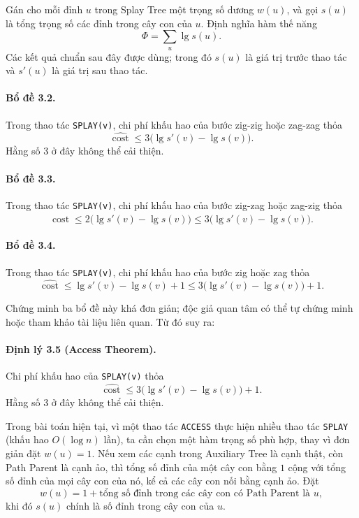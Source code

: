 \documentclass[11pt]{article}
\begin{document}
Gán cho mỗi đỉnh $u$ trong Splay Tree một trọng số dương $w(u)$, và gọi $s(u)$
là tổng trọng số các đỉnh trong cây con của $u$. Định nghĩa hàm thế năng
\[
  \Phi=\sum_u \lg s(u).
\]
Các kết quả chuẩn sau đây được dùng; trong đó $s(u)$ là giá trị trước thao tác
và $s'(u)$ là giá trị sau thao tác.

\paragraph{Bổ đề 3.2.}
Trong thao tác \texttt{SPLAY(v)}, chi phí khấu hao của bước zig-zig hoặc
zag-zag thỏa
\[
  \widehat{\operatorname{cost}}
  \le 3\bigl(\lg s'(v)-\lg s(v)\bigr).
\]
Hằng số $3$ ở đây không thể cải thiện.

\paragraph{Bổ đề 3.3.}
Trong thao tác \texttt{SPLAY(v)}, chi phí khấu hao của bước zig-zag hoặc
zag-zig thỏa
\[
  \widehat{\operatorname{cost}}
  \le 2\bigl(\lg s'(v)-\lg s(v)\bigr)
  \le 3\bigl(\lg s'(v)-\lg s(v)\bigr).
\]

\paragraph{Bổ đề 3.4.}
Trong thao tác \texttt{SPLAY(v)}, chi phí khấu hao của bước zig hoặc zag thỏa
\[
  \widehat{\operatorname{cost}}
  \le \lg s'(v)-\lg s(v)+1
  \le 3\bigl(\lg s'(v)-\lg s(v)\bigr)+1.
\]

Chứng minh ba bổ đề này khá đơn giản; độc giả quan tâm có thể tự chứng minh
hoặc tham khảo tài liệu liên quan. Từ đó suy ra:

\paragraph{Định lý 3.5 (Access Theorem).}
Chi phí khấu hao của \texttt{SPLAY(v)} thỏa
\[
  \widehat{\operatorname{cost}}
  \le 3\bigl(\lg s'(v)-\lg s(v)\bigr)+1.
\]
Hằng số $3$ ở đây không thể cải thiện.

Trong bài toán hiện tại, vì một thao tác \texttt{ACCESS} thực hiện nhiều thao
tác \texttt{SPLAY} (khấu hao $O(\log n)$ lần), ta cần chọn một hàm trọng số
phù hợp, thay vì đơn giản đặt $w(u)=1$. Nếu xem các cạnh trong Auxiliary Tree
là cạnh thật, còn Path Parent là cạnh ảo, thì tổng số đỉnh của một cây con bằng
$1$ cộng với tổng số đỉnh của mọi cây con của nó, kể cả các cây con nối bằng
cạnh ảo. Đặt
\[
  w(u)=1+\text{tổng số đỉnh trong các cây con có Path Parent là }u,
\]
khi đó $s(u)$ chính là số đỉnh trong cây con của $u$.
\end{document}
